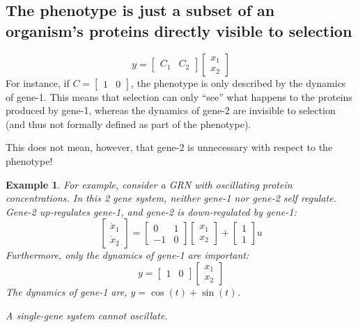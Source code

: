 \documentclass[11 pt]{article}
\newcommand{\1}{\mathbbm{1}}
\newtheorem{example}{Example}
\begin{document}
  \subsection{The phenotype is just a subset of an organism's proteins directly visible to selection}
    \begin{equation*}
      y = \begin{bmatrix} C_{1} & C_{2} \end{bmatrix} \begin{bmatrix} x_{1} \\ x_{2} \end{bmatrix}
    \end{equation*}
    For instance, if $C = \begin{bmatrix} 1 & 0 \end{bmatrix}$, the phenotype is only described by the dynamics of gene-1. This means that selection can only ``see'' what happens to the proteins produced by gene-1, whereas the dynamics of gene-2 are invisible to selection (and thus not formally defined as part of the phenotype).
      
      This does not mean, however, that gene-2 is unnecessary with respect to the phenotype!

        \begin{example}
          For example, consider a GRN with oscillating protein concentrations.
    In this 2 gene system, neither gene-1 nor gene-2 self regulate. Gene-2 up-regulates gene-1, and gene-2 is down-regulated by gene-1:
      \begin{equation*}
        \begin{bmatrix} \dot{x}_{1} \\ \dot{x}_{2} \end{bmatrix} = \begin{bmatrix} 0 & 1 \\ -1 & 0 \end{bmatrix} \begin{bmatrix} x_{1} \\ x_{2} \end{bmatrix} + \begin{bmatrix} 1 \\ 1 \end{bmatrix} u
      \end{equation*}
      Furthermore, only the dynamics of gene-1 are important:
      \begin{equation*}
        y = \begin{bmatrix} 1 & 0 \end{bmatrix} \begin{bmatrix} x_{1} \\ x_{2} \end{bmatrix}
      \end{equation*}
    The dynamics of gene-1 are, $y = \cos(t) + \sin(t)$.

    A single-gene system cannot oscillate.
  \end{example}
\end{document}
